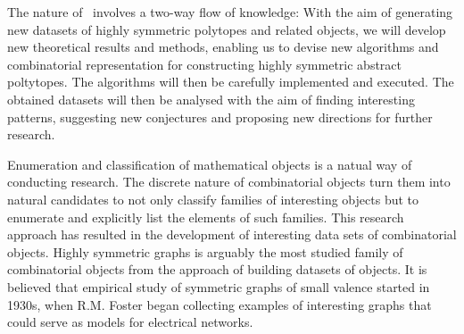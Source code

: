 The nature of \ourp\ involves a two-way flow of knowledge:
With the aim of generating new datasets of highly symmetric polytopes and related objects, we will develop new theoretical results and methods, enabling us to devise new algorithms and combinatorial representation for constructing highly symmetric abstract poltytopes.
The algorithms will then be carefully implemented and executed.
The obtained datasets will then be analysed with the aim of finding interesting patterns, suggesting new conjectures and proposing new directions for further research.


Enumeration and classification of mathematical objects is a natual way of conducting research.
The discrete nature of combinatorial objects turn them into natural candidates to not only classify families of interesting objects but to enumerate and explicitly list the elements of such families.
This research approach has resulted in the development of interesting data sets of combinatorial objects.
Highly symmetric graphs is arguably the most studied family of combinatorial objects from the approach of building datasets of objects.
It is believed that empirical study of symmetric graphs of small valence started in 1930s, when R.M. Foster began collecting examples of interesting graphs that could serve as models for electrical networks.

